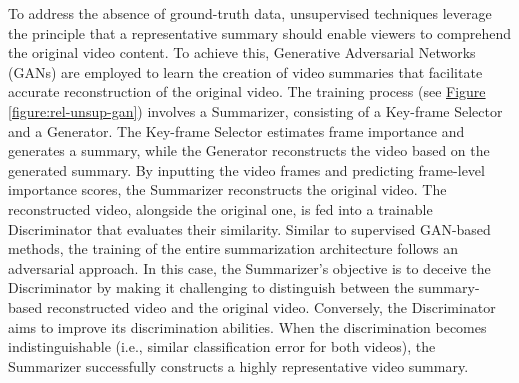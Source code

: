 To address the absence of ground-truth data, unsupervised techniques leverage the principle that a representative summary should enable viewers to comprehend the original video content. To achieve this, Generative Adversarial Networks (GANs) are employed to learn the creation of video summaries that facilitate accurate reconstruction of the original video. The training process (see \hyperref[figure:rel-unsup-gan]{Figure \ref{figure:rel-unsup-gan}}) involves a Summarizer, consisting of a Key-frame Selector and a Generator. The Key-frame Selector estimates frame importance and generates a summary, while the Generator reconstructs the video based on the generated summary. By inputting the video frames and predicting frame-level importance scores, the Summarizer reconstructs the original video. The reconstructed video, alongside the original one, is fed into a trainable Discriminator that evaluates their similarity. Similar to supervised GAN-based methods, the training of the entire summarization architecture follows an adversarial approach. In this case, the Summarizer's objective is to deceive the Discriminator by making it challenging to distinguish between the summary-based reconstructed video and the original video. Conversely, the Discriminator aims to improve its discrimination abilities. When the discrimination becomes indistinguishable (i.e., similar classification error for both videos), the Summarizer successfully constructs a highly representative video summary.  

